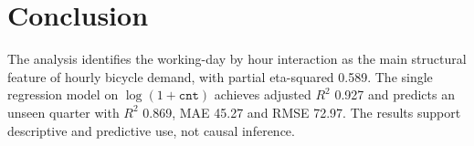 \documentclass[12pt]{article}
\begin{document}
\section{Conclusion}

The analysis identifies the working-day by hour interaction as the main
structural feature of hourly bicycle demand, with partial eta-squared 0.589.
The single regression model on $\log(1+\texttt{cnt})$ achieves adjusted $R^2$
0.927 and predicts an unseen quarter with $R^2$ 0.869, MAE 45.27 and RMSE 72.97.
The results support descriptive and predictive use, not causal inference.



\end{document}
